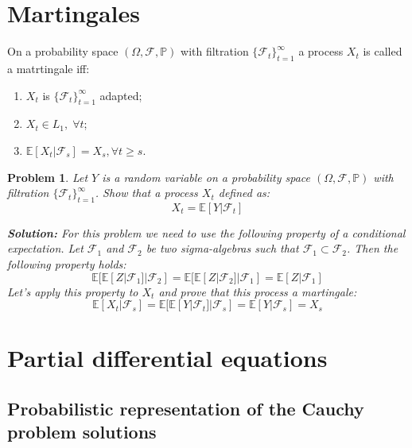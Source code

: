 \documentclass[a4paper, 12pt]{article}
\theoremstyle{problemstyle}
\newtheorem{problem}{Problem}[section]
\newenvironment{solution}
{\textit{\textbf{Solution:}}}
{}
\newcommand{\E}{\mathbb{E}}
\renewcommand{\P}{\mathbb{P}}
\begin{document}
\section{Martingales}
On a probability space $(\Omega, \mathcal{F}, \P)$ with filtration $\{\mathcal{F}_t\}_{t=1}^{\infty}$ a process $X_t$ is called a matrtingale iff:
\begin{enumerate}
	\item $X_t$ is $\{\mathcal{F}_t\}_{t=1}^{\infty}$ adapted;
	\item $X_t \in L_1, \; \forall t$;
	\item $\E[X_t | \mathcal{F}_s] = X_s, \forall t \geq s$.
\end{enumerate}

\begin{problem}
	Let $Y$ is a random variable on a probability space $(\Omega, \mathcal{F}, \P)$ with filtration $\{\mathcal{F}_t\}_{t=1}^{\infty}$. Show that a process $X_t$ defined as:
	\begin{equation}
	X_t = \E[Y|\mathcal{F}_t]
	\end{equation}
	
	\begin{solution}
		For this problem we need to use the following property of a conditional expectation. Let  $\mathcal{F}_1$ and $\mathcal{F}_2$ be two sigma-algebras such that $\mathcal{F}_1 \subset \mathcal{F}_2$. Then the following property holds:
		\begin{equation}
		\E[\E[Z |\mathcal{F}_1] | \mathcal{F}_2] = 
		\E[\E[Z |\mathcal{F}_2] | \mathcal{F}_1] = 
		\E[Z|\mathcal{F}_1] 
		\end{equation}
		Let's apply this property to $X_t$ and prove that this process a martingale:
		\begin{equation}
		\E[X_t |\mathcal{F}_s] = 
		\E[\E[Y|\mathcal{F}_t]| \mathcal{F}_s] = 
		\E[Y|\mathcal{F}_s] = X_s
		\end{equation}
	\end{solution}
\end{problem}

\section{Partial differential equations}
\subsection{Probabilistic representation of the Cauchy problem solutions}
\end{document}
